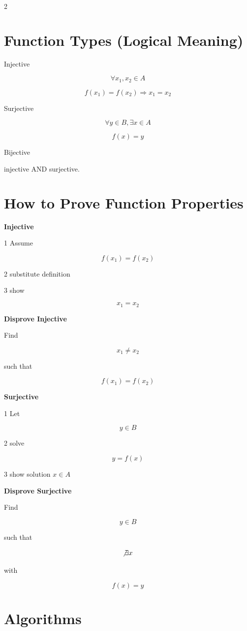 \documentclass[9pt]{article}
\begin{document}
\begin{multicols}{2}
\section*{Function Types (Logical Meaning)}

Injective

\[
\forall x_1,x_2\in A
\]

\[
f(x_1)=f(x_2)\Rightarrow x_1=x_2
\]

Surjective

\[
\forall y\in B,\exists x\in A
\]

\[
f(x)=y
\]

Bijective

injective AND surjective.

\section*{How to Prove Function Properties}

\textbf{Injective}

1 Assume

\[
f(x_1)=f(x_2)
\]

2 substitute definition

3 show

\[
x_1=x_2
\]

\textbf{Disprove Injective}

Find

\[
x_1\ne x_2
\]

such that

\[
f(x_1)=f(x_2)
\]


\textbf{Surjective}

1 Let

\[
y\in B
\]

2 solve

\[
y=f(x)
\]

3 show solution $x\in A$

\textbf{Disprove Surjective}

Find

\[
y\in B
\]

such that

\[
\not\exists x
\]

with

\[
f(x)=y
\]

\section*{Algorithms}


\end{multicols}
\end{document}
